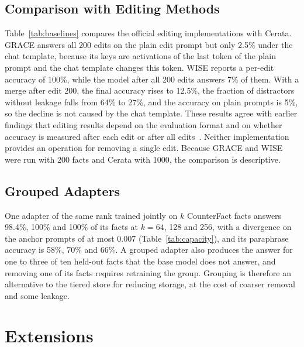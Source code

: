 \documentclass[journal,10pt]{IEEEtran}
\begin{document}
\subsection{Comparison with Editing Methods}



Table~\ref{tab:baselines} compares the official editing implementations with Cerata.
GRACE answers all 200 edits on the plain edit prompt but only 2.5\% under the chat
template, because its keys are activations of the last token of the plain prompt and
the chat template changes this token. WISE reports a per-edit accuracy of 100\%, while
the model after all 200 edits answers 7\% of them. With a merge after edit 200, the final
accuracy rises to 12.5\%, the fraction of distractors without leakage falls from 64\% to
27\%, and the accuracy on plain prompts is 5\%, so the decline is not caused by the chat
template. These results agree with earlier findings that editing results depend on the
evaluation format and on whether accuracy is measured after each edit or after all
edits~\cite{yang2025mirage,gupta2024forgetting}. Neither implementation provides an
operation for removing a single edit. Because GRACE and WISE were run with 200 facts and
Cerata with 1000, the comparison is descriptive.

\subsection{Grouped Adapters}
\label{sec:capacity}



One adapter of the same rank trained jointly on $k$ CounterFact facts answers 98.4\%,
100\% and 100\% of its facts at $k=64$, 128 and 256, with a divergence on the anchor
prompts of at most 0.007 (Table~\ref{tab:capacity}), and its paraphrase accuracy is 58\%,
70\% and 66\%. A grouped adapter also produces the answer for one to three of ten held-out
facts that the base model does not answer, and removing one of its facts requires
retraining the group. Grouping is therefore an alternative to the tiered store for
reducing storage, at the cost of coarser removal and some leakage.

\section{Extensions}
\label{sec:loop}
\end{document}
